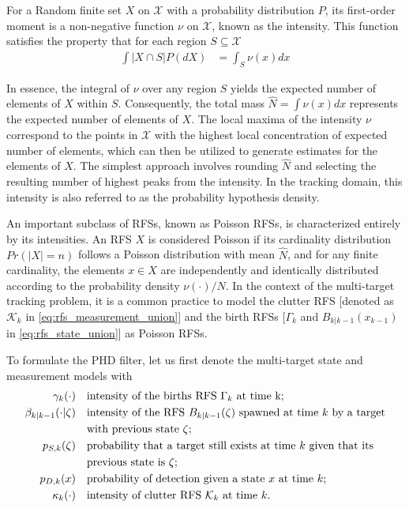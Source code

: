 For a Random finite set $X$ on $\mathcal{X}$ with a probability distribution $P$, its first-order moment is a
non-negative function $\nu$ on $\mathcal{X}$, known as the intensity. This function satisfies the property that for
each region $S \subseteq \mathcal{X}$ \cite{daley2003}
\begin{align}
    \int |X \cap S | P(dX) &= \int_S \nu(x)dx
\end{align}

In essence, the integral of $\nu$ over any region $S$ yields the expected number of elements of $X$ within $S$.
Consequently, the total mass $\hat{N} = \int \nu(x)dx$ represents the expected number of elements of $X$. The local
maxima of the intensity $\nu$ correspond to the points in $\mathcal{X}$ with the highest local concentration of expected
number of elements, which can then be utilized to generate estimates for the elements of $X$. The simplest approach involves rounding $\hat{N}$ and selecting the resulting number of highest peaks from the intensity. In the tracking domain, this intensity is also referred to as the probability hypothesis density.

An important subclass of RFSs, known as Poisson RFSs, is characterized entirely by its intensities. An RFS $X$ is
considered Poisson if its cardinality distribution $Pr(|X| = n)$ follows a Poisson distribution with mean $\hat{N}$,
and for any finite cardinality, the elements $x \in X$ are independently and identically distributed according to
the probability density $\nu(\cdot)/N$. In the context of the multi-target tracking problem, it is a common practice
to model the clutter RFS [denoted as $\mathcal{K}_k$ in \eqref{eq:rfs_measurement_union}] and the birth RFSs [$\Gamma
_k $
and $B_{k|k-1}(x_{k-1})$ in \eqref{eq:rfs_state_union}] as Poisson RFSs.

To formulate the PHD filter, let us first denote the multi-target state and measurement models with
\begin{align}
    \gamma_k(\cdot) \quad & \text{intensity of the births RFS $\Gamma_k$ at time k;} \\
    \beta_{k|k-1}(\cdot|\zeta) \quad & \text{intensity of the RFS $B_{k|k-1}(\zeta)$ spawned at time $k$ by a target} \notag \\
                                 \quad &  \text{with previous state $\zeta$;} \\
    p_{S,k}(\zeta) \quad & \text{probability that a target still exists at time $k$ given that its } \notag \\
                    \quad & \text{previous state is $\zeta$;} \\
    p_{D,k}(x) \quad & \text{probability of detection given a state $x$ at time $k$;} \\
    \kappa_k(\cdot) \quad & \text{intensity of clutter RFS $\mathcal{K}_k$ at time $k$}.
\end{align}

